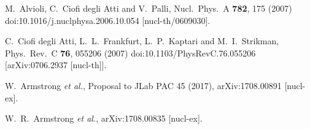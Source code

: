 \documentclass[twocolumn]{revtex4}
\begin{document}
\begin{thebibliography}{25}
  M.~Alvioli, C.~Ciofi degli Atti and V.~Palli,
  Nucl.\ Phys.\ A {\bf 782}, 175 (2007)
  doi:10.1016/j.nuclphysa.2006.10.054
  [nucl-th/0609030].

  C.~Ciofi degli Atti, L.~L.~Frankfurt, L.~P.~Kaptari and M.~I.~Strikman,
  Phys.\ Rev.\ C {\bf 76}, 055206 (2007)
  doi:10.1103/PhysRevC.76.055206
  [arXiv:0706.2937 [nucl-th]].

  W.~Armstrong {\it et al.},
  Proposal to JLab PAC 45 (2017),
  arXiv:1708.00891 [nucl-ex].

  W.~R.~Armstrong {\it et al.},
  arXiv:1708.00835 [nucl-ex].


\end{thebibliography}
\end{document}
